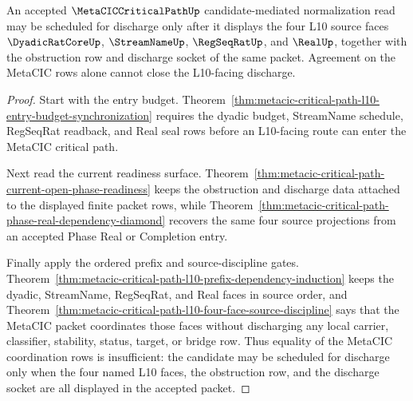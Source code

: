 \begin{theorem}
\label{thm:metacic-critical-path-l10-candidate-discharge-gate}
An accepted $\MetaCICCriticalPathUp$ candidate-mediated normalization read may be scheduled for discharge only after it displays the four L10 source faces $\DyadicRatCoreUp$, $\StreamNameUp$, $\RegSeqRatUp$, and $\RealUp$, together with the obstruction row and discharge socket of the same packet. Agreement on the MetaCIC rows alone cannot close the L10-facing discharge.
\end{theorem}
\begin{proof}
Start with the entry budget. Theorem~\ref{thm:metacic-critical-path-l10-entry-budget-synchronization} requires the dyadic budget, StreamName schedule, RegSeqRat readback, and Real seal rows before an L10-facing route can enter the MetaCIC critical path.

Next read the current readiness surface. Theorem~\ref{thm:metacic-critical-path-current-open-phase-readiness} keeps the obstruction and discharge data attached to the displayed finite packet rows, while Theorem~\ref{thm:metacic-critical-path-phase-real-dependency-diamond} recovers the same four source projections from an accepted Phase Real or Completion entry.

Finally apply the ordered prefix and source-discipline gates. Theorem~\ref{thm:metacic-critical-path-l10-prefix-dependency-induction} keeps the dyadic, StreamName, RegSeqRat, and Real faces in source order, and Theorem~\ref{thm:metacic-critical-path-l10-four-face-source-discipline} says that the MetaCIC packet coordinates those faces without discharging any local carrier, classifier, stability, status, target, or bridge row. Thus equality of the MetaCIC coordination rows is insufficient: the candidate may be scheduled for discharge only when the four named L10 faces, the obstruction row, and the discharge socket are all displayed in the accepted packet.
\end{proof}
